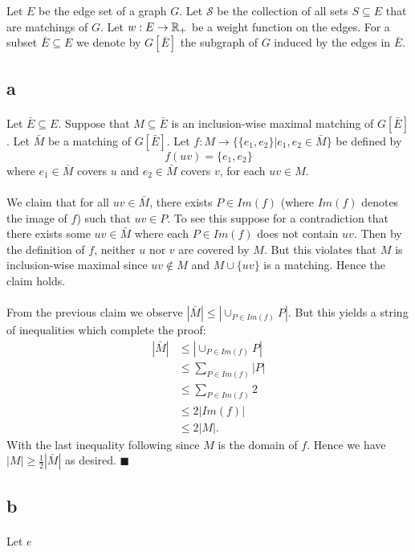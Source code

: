 \documentclass[letterpaper,12pt,oneside,onecolumn]{article}
\newcommand{\cS}{\mathcal{S}} \newcommand{\cT}{\mathcal{T}}
\begin{document}
\section{}
\paragraph{}
Let $E$ be the edge set of a graph $G$. Let $\cS$ be the collection of all sets $S \subseteq E$ that are matchings of $G$. Let $w: E \rightarrow \mathbb{R}_+$ be a weight function on the edges. For a subset $\bar{E} \subseteq E$ we denote by $G[\bar{E}]$ the subgraph of $G$ induced by the edges in $\bar{E}$.
\subsection{a}
\paragraph{}
Let $\bar{E} \subseteq E$. Suppose that $M \subseteq \bar{E}$ is an inclusion-wise maximal matching of $G[\bar{E}]$. Let $\bar{M}$ be a matching of $G[\bar{E}]$. Let $f : M \rightarrow \{ \{e_1,e_2\} | e_1, e_2 \in \bar{M}\}$ be defined by
$$ f(uv) = \{e_1, e_2\}$$
where $e_1 \in \bar{M}$ covers $u$ and $e_2 \in \bar{M}$ covers $v$, for each $uv \in M$.
\paragraph{}
We claim that for all $uv \in \bar{M}$, there exists $P \in Im(f)$ (where $Im(f)$ denotes the image of $f$) such that $uv \in P$. To see this suppose for a contradiction that there exists some $uv \in \bar{M}$ where each $P \in Im(f)$ does not contain $uv$. Then by the definition of $f$, neither $u$ nor $v$ are covered by $M$. But this violates that $M$ is inclusion-wise maximal since $uv \not\in M$ and $M \cup \{uv\}$ is a matching. Hence the claim holds.
\paragraph{}
From the previous claim we observe $|\bar{M}| \leq | \cup_{P \in Im(f)} P|$. But this yields a string of inequalities which complete the proof:
\begin{align*}
|\bar{M}| &\leq |\cup_{P \in Im(f)} P| \\
&\leq \sum_{P \in Im(f)} |P| \\
&\leq \sum_{P \in Im(f)} 2 \\
&\leq 2|Im(f)| \\
&\leq 2|M|. 
\end{align*}
With the last inequality following since $M$ is the domain of $f$. Hence we have $|M| \geq \frac{1}{2}|\bar{M}|$ as desired. $\blacksquare$
\subsection{b}
\paragraph{}
Let $e$
\end{document}
